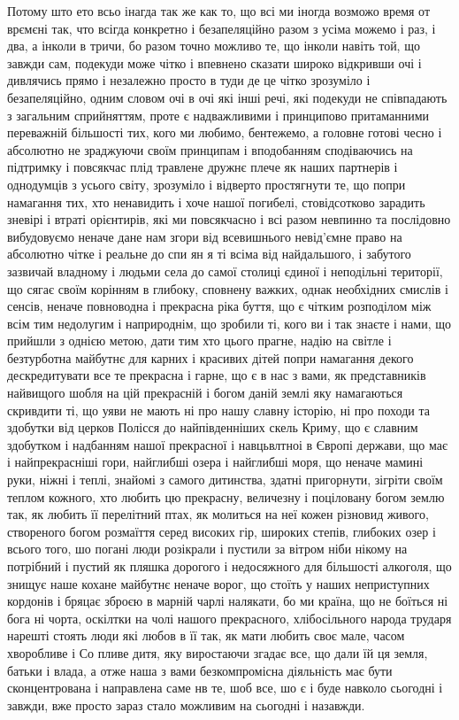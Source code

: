 Потому што ето всьо інагда так же как то, що всі ми іногда возможо время от
врємєні так, что всігда конкретно і безапеляційно разом з усіма можемо і раз, і
два, а інколи в тричи, бо разом точно можливо те, що інколи навіть той, що
завжди сам, подекуди може чітко і впевнено сказати широко відкривши очі і
дивлячись прямо і незалежно просто в туди де це чітко зрозуміло і
безапеляційно, одним словом очі в очі які інші речі, які подекуди не
співпадають з загальним сприйняттям, проте є надважливими і принципово
притаманними переважній більшості тих, кого ми любимо, бентежемо, а головне
готові чесно і абсолютно не зраджуючи своїм принципам і вподобанням
сподіваючись на підтримку і повсякчас плід травлене дружнє плече як наших
партнерів і однодумців з усього світу, зрозуміло і відверто простягнути те, що
попри намагання тих, хто ненавидить і хоче нашої погибелі, стовідсотково
зарадить зневірі і втраті орієнтирів, які ми повсякчасно і всі разом невпинно
та послідовно вибудовуємо неначе дане нам згори від всевишнього невід’ємне
право на абсолютно чітке і реальне до спи ян я ті всіма від найдальшого, і
забутого зазвичай владному і людьми села до самої столиці єдиної і неподільні
території, що сягає своїм корінням в глибоку, сповнену важких, однак необхідних
смислів і сенсів, неначе повноводна і прекрасна ріка буття, що є чітким
розподілом між всім тим недолугим і наприроднім, що зробили ті, кого ви і так
знаєте і нами, що прийшли з однією метою, дати тим хто цього прагне, надію на
світле і безтурботна майбутнє для карних і красивих дітей попри намагання
декого дескредитувати все те прекрасна і гарне, що є в нас з вами, як
представників найвищого шобля на цій прекрасній і богом даній землі яку
намагаються скривдити ті, що уяви не мають ні про нашу славну історію, ні про
походи та здобутки від церков Полісся до найпівденніших скель Криму, що є
славним здобутком і надбанням нашої прекрасної і навцьвлтноі в Європі держави,
що має і найпрекрасніші гори, найглибші озера і найглибші моря, що неначе
мамині руки, ніжні і теплі, знайомі з самого дитинства, здатні пригорнути,
зігріти своїм теплом кожного, хто любить цю прекрасну, величезну і поціловану
богом землю так, як любить її перелітний птах, як молиться на неї кожен
різновид живого, створеного богом розмаїття серед високих гір, широких степів,
глибоких озер і всього того, шо погані люди розікрали і пустили за вітром ніби
нікому на потрібний і пустий як пляшка дорогого і недосяжного для більшості
алкоголя, що знищує наше кохане майбутнє неначе ворог, що стоїть у наших
неприступних кордонів і бряцає зброєю в марній чарлі налякати, бо ми країна, що
не боїться ні бога ні чорта, оскілтки на чолі нашого прекрасного, хлібосільного
народа трударя нарешті стоять люди які любов в її так, як мати любить своє
мале, часом хворобливе і Со пливе дитя, яку виростаючи згадає все, що дали їй
ця земля, батьки і влада, а отже наша з вами безкомпромісна діяльність має бути
сконцентрована і направлена саме нв те, шоб все, шо є і буде навколо сьогодні і
завжди, вже просто зараз стало можливим на сьогодні і назавжди.
